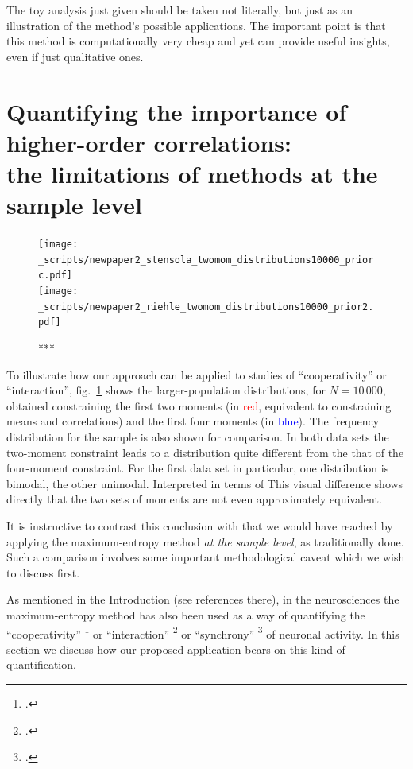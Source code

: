 \documentclass[\ifafour a4paper,12pt,\else a5paper,10pt,\fi%
onecolumn,oneside,article,%
british%
]{memoir}
\theoremstyle{remark}
\theoremstyle{innote}
\newcommand*{\citep}{\footcites}
\renewcommand*{\|}{\nonscript\,\vert\nonscript\;\mathopen{}}
\newcommand*{\fig}{fig.}%
\newcommand*{\eg}{{e.g.}}
\begin{document}
\medskip

The toy analysis just given should be taken not literally, but just as an
illustration of the method's possible applications. The important point is
that this method is computationally very cheap and yet can provide useful
insights, even if just qualitative ones.




\section{Quantifying the importance of higher-order correlations:\\
  the limitations of methods at the sample level}
\label{sec:marginalization}

\begin{figure}[!p]
\centering
\texttt{[image: \_scripts/newpaper2\_stensola\_twomom\_distributions10000\_priorc.pdf]}%
\\[3em]%
\texttt{[image: \_scripts/newpaper2\_riehle\_twomom\_distributions10000\_prior2.pdf]}%
\caption{***}
\label{fig:plots_2_4mom}
\end{figure}
To illustrate how our approach can be applied to studies of
\enquote{cooperativity} or \enquote{interaction},
\fig~\ref{fig:plots_2_4mom} shows the larger-population distributions, for
$N=10\,000$, obtained constraining the first two moments (in
\textcolor{red}{red}, equivalent to constraining means and correlations)
and the first four moments (in \textcolor{blue}{blue}). The frequency
distribution for the sample is also shown for comparison. In both data sets
the two-moment constraint leads to a distribution quite different from the
that of the four-moment constraint. For the first data set in particular,
one distribution is bimodal, the other unimodal. Interpreted in terms of
This visual difference shows directly that the two sets of moments are not
even approximately equivalent.

It is instructive to contrast this conclusion with that we would have
reached by applying the maximum-entropy method \emph{at the sample level},
as traditionally done. Such a comparison involves some important
methodological caveat which we wish to discuss first.

\bigskip


As mentioned in the Introduction (see references there), in the
neurosciences the maximum-entropy method has also been used as a way of
quantifying the \enquote{cooperativity} \citep[\eg][]{gersteinetal1985} or
\enquote{interaction}
\citep[\eg][]{martignonetal1995,schneidmanetal2006,shlensetal2006} or
\enquote{synchrony} \citep[\eg][-- we're only citing early papers using
these terms]{bohteetal2000,amarietal2003} of neuronal
activity. In this section we discuss how our proposed
application bears on this kind of quantification. %
\end{document}
